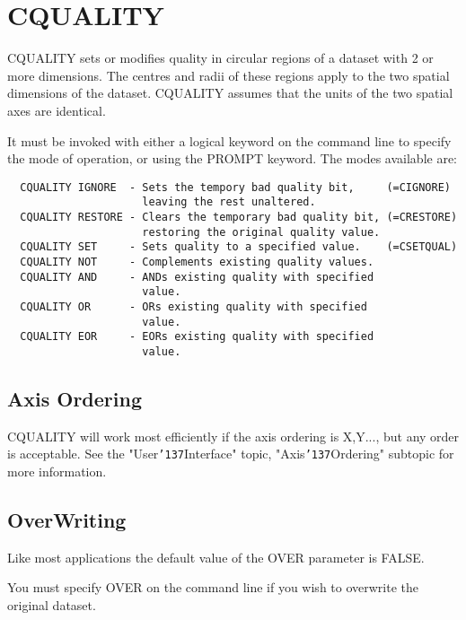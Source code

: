 \documentclass{book}
\renewcommand{\_}{{\tt\char'137}}     %
\begin{document}
\section{CQUALITY}
CQUALITY sets or modifies quality in circular regions of a dataset
with 2 or more dimensions. The centres and radii of these regions
apply to the two spatial dimensions of the dataset. CQUALITY assumes
that the units of the two spatial axes are identical.
 
It must be invoked with either a logical keyword on the command line
to specify the mode of operation, or using the PROMPT keyword. The
modes available are:
\begin{verbatim}
  CQUALITY IGNORE  - Sets the tempory bad quality bit,     (=CIGNORE)
                     leaving the rest unaltered.
  CQUALITY RESTORE - Clears the temporary bad quality bit, (=CRESTORE)
                     restoring the original quality value.
  CQUALITY SET     - Sets quality to a specified value.    (=CSETQUAL)
  CQUALITY NOT     - Complements existing quality values.
  CQUALITY AND     - ANDs existing quality with specified
                     value.
  CQUALITY OR      - ORs existing quality with specified
                     value.
  CQUALITY EOR     - EORs existing quality with specified
                     value.
\end{verbatim}
\subsection{Axis Ordering}
CQUALITY will work most efficiently if the axis ordering is X,Y...,
but any order is acceptable. See the "User\_Interface" topic,
"Axis\_Ordering" subtopic for more information.
 
\subsection{OverWriting}
Like most applications the default value of the OVER
parameter is FALSE.
 
You must specify OVER on the command line if you wish to
overwrite the original dataset.
 
\end{document}
